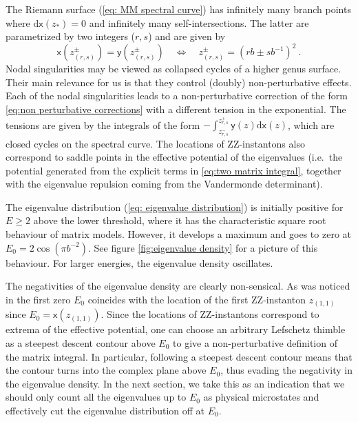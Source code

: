 \documentclass[12pt,a4paper]{article}
\renewcommand\d{\text{d}}
\renewcommand{\ge}{\geqslant}
\newcommand{\xx}{\mathsf{x}}
\newcommand{\yy}{\mathsf{y}}
\begin{document}
The Riemann surface (\ref{eq: MM spectral curve}) has infinitely many branch points where $\d \xx(z_*)=0$ and infinitely many self-intersections. The latter are parametrized by two integers ($r,s$) and are given by
\begin{equation}
    \xx(z_{(r,s)}^\pm) = \yy(z_{(r,s)}^\pm) \quad \Leftrightarrow \quad z_{(r,s)}^\pm =(rb \pm s b^{-1})^2~.
\end{equation}
Nodal singularities may be viewed as collapsed cycles of a higher genus surface.
Their main relevance for us is that they control (doubly) non-perturbative effects. Each of the nodal singularities leads to a non-perturbative correction of the form \eqref{eq:non perturbative corrections} with a different tension in the exponential. The tensions are given by the integrals of the form $-\int_{z_{r,s}^-}^{z_{r,s}^+} \yy(z) \d \xx(z)$, which are closed cycles on the spectral curve.
The locations of ZZ-instantons also correspond to saddle points in the effective potential of the eigenvalues (i.e.\ the potential generated from the explicit terms in \eqref{eq:two matrix integral}, together with the eigenvalue repulsion coming from the Vandermonde determinant).

The eigenvalue distribution (\ref{eq: eigenvalue distribution}) is initially positive for $E \ge 2$ above the lower threshold, where it has the characteristic square root behaviour of matrix models. However, it develops a maximum and goes to zero at $E_{0}= 2 \cos(\pi b^{-2})$. See figure \ref{fig:eigenvalue density} for a picture of this behaviour. For larger energies, the eigenvalue density oscillates. 

The negativities of the eigenvalue density are clearly non-sensical.
As was noticed in \cite{paper3} the first zero $E_0$ coincides with the location of the first ZZ-instanton $z_{(1,1)}$ since $E_0=\xx(z_{(1,1)})$. Since the locations of ZZ-instantons correspond to extrema of the effective potential, one can choose an arbitrary Lefschetz thimble as a steepest descent contour above $E_0$ to give a non-perturbative definition of the matrix integral. In particular, following a steepest descent contour means that the contour turns into the complex plane above $E_0$, thus evading the negativity in the eigenvalue density.
In the next section, we take this as an indication that we should only count all the eigenvalues up to $E_0$ as physical microstates and effectively cut the eigenvalue distribution off at $E_0$.






\end{document}
